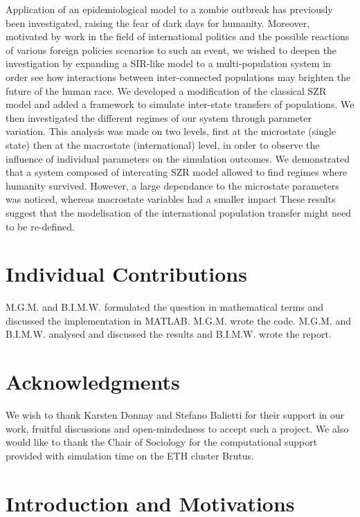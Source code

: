 \documentclass[11pt]{article} %
\begin{document}
Application of an epidemiological model to a zombie outbreak has previously been investigated, raising the fear of dark days for humanity. Moreover, motivated by work in the field of international politics and the possible reactions of various foreign policies scenarios to such an event, we wished to deepen the investigation by expanding a SIR-like model to a multi-population system in order see how interactions between inter-connected populations may brighten the future of the human race. We developed a modification of the classical SZR model and added a framework to simulate inter-state transfers of populations. We then investigated the different regimes of our system through parameter variation. This analysis was made on two levels, first at the microstate (single state) then at the macrostate (international) level, in order to observe the influence of individual parameters on the simulation outcomes. We demonstrated that a system composed of intercating SZR model allowed to find regimes where humanity survived. However, a large dependance to the microstate parameters was noticed, whereas macrostate variables had a smaller impact These results suggest that the modelisation of the international population transfer might need to be re-defined.  


\section{Individual Contributions}\indent

M.G.M. and B.I.M.W. formulated the question in mathematical terms and discussed the implementation in MATLAB. M.G.M. wrote the code. M.G.M. and B.I.M.W. analysed and discussed the results and B.I.M.W. wrote the report.

\section{Acknowledgments}\indent

We wish to thank Karsten Donnay and Stefano Balietti for their support in our work, fruitful discussions and open-mindedness to accept such a project. We also would like to thank the Chair of Sociology for the computational support provided with simulation time on the ETH cluster Brutus.







\newpage
\section{Introduction and Motivations}\indent
\end{document}

